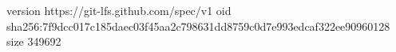version https://git-lfs.github.com/spec/v1
oid sha256:7f9dcc017c185daec03f45aa2c798631dd8759c0d7e993edcaf322ee90960128
size 349692

